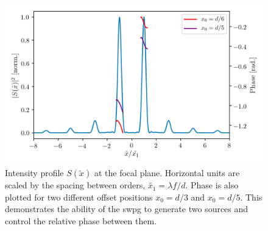 \begin{figure}
	\centering
	\includegraphics[width=1.0\textwidth]{figures/Two_source/intensity_and_phase.png}
	\caption{Intensity profile $S(\tilde{x})$ at the focal plane. Horizontal units are scaled by the spacing between orders, $\tilde{x_1}=\lambda f/d$.  Phase is also plotted for two different offset positions $x_0=d/3$ and $x_0=d/5$.  This demonstrates the ability of the \gls{swpg} to generate two sources and control the relative phase between them.}
	\label{fig:s^2}
\end{figure}


